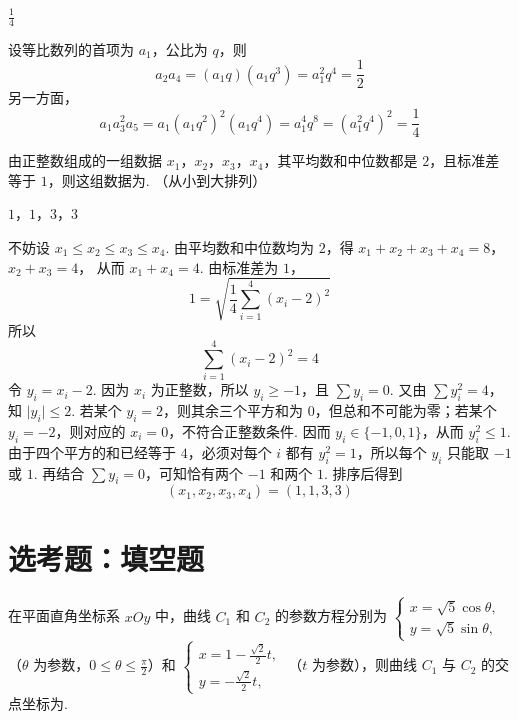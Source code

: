 \begin{answer}
\(\frac{1}{4}\)
\end{answer}

\begin{solution}
设等比数列的首项为 \(a_1\)，公比为 \(q\)，则
\[
a_2a_4=(a_1q)(a_1q^3)=a_1^2q^4=\frac12
\]
另一方面，
\[
a_1a_3^2a_5=a_1(a_1q^2)^2(a_1q^4)=a_1^4q^8=(a_1^2q^4)^2=\frac14
\]
\end{solution}

\begin{problem}
由正整数组成的一组数据 \(x_{1}\)，\(x_{2}\)，\(x_{3}\)，\(x_{4}\)，其平均数和中位数都是 \(2\)，且标准差等于 \(1\)，则这组数据为\fillinblank{}. （从小到大排列）
\end{problem}

\begin{answer}
\(1\)，\(1\)，\(3\)，\(3\)
\end{answer}

\begin{solution}
不妨设 \(x_1\leqslant x_2\leqslant x_3\leqslant x_4\). 由平均数和中位数均为 \(2\)，得
\(x_1+x_2+x_3+x_4=8\)，\(x_2+x_3=4\)，
从而 \(x_1+x_4=4\). 由标准差为 \(1\)，
\[
1=\sqrt{\frac14\sum_{i=1}^{4}(x_i-2)^2}
\]
所以
\[
\sum_{i=1}^{4}(x_i-2)^2=4
\]
令 \(y_i=x_i-2\). 因为 \(x_i\) 为正整数，所以 \(y_i\geqslant-1\)，且 \(\sum y_i=0\). 又由 \(\sum y_i^2=4\)，知 \(\lvert y_i\rvert\leqslant2\). 若某个 \(y_i=2\)，则其余三个平方和为 \(0\)，但总和不可能为零；若某个 \(y_i=-2\)，则对应的 \(x_i=0\)，不符合正整数条件. 因而 \(y_i\in\{-1,0,1\}\)，从而 \(y_i^2\leqslant1\). 由于四个平方的和已经等于 \(4\)，必须对每个 \(i\) 都有 \(y_i^2=1\)，所以每个 \(y_i\) 只能取 \(-1\) 或 \(1\). 再结合 \(\sum y_i=0\)，可知恰有两个 \(-1\) 和两个 \(1\). 排序后得到
\[
(x_1,x_2,x_3,x_4)=(1,1,3,3)
\]
\end{solution}

\section{选考题：填空题}

\begin{problem}
在平面直角坐标系 \(xOy\) 中，曲线 \(C_1\) 和 \(C_2\) 的参数方程分别为 \(\begin{cases}
x = \sqrt{5} \cos \theta,\\
y = \sqrt{5} \sin \theta,
\end{cases}\) （\(\theta\) 为参数，\(0 \leqslant \theta \leqslant \frac{\pi}{2}\)）和 \(\begin{cases}
x = 1 - \frac{\sqrt{2}}{2} t,\\
y = -\frac{\sqrt{2}}{2} t,
\end{cases}\) （\(t\) 为参数），则曲线 \(C_1\) 与 \(C_2\) 的交点坐标为\fillinblank{}.
\end{problem}

